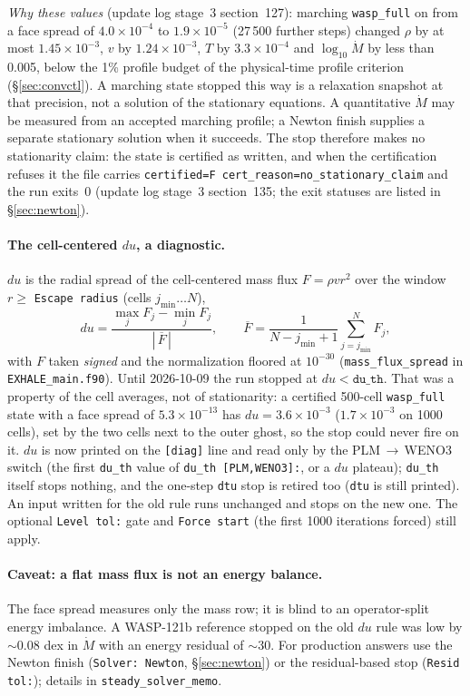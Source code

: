\documentclass[english,a4paper]{my_memo}
\begin{document}
\emph{Why these values} (update log stage~3 section~127): marching
\texttt{wasp\_full} on from a face spread of $4.0\times10^{-4}$ to
$1.9\times10^{-5}$ (27\,500 further steps) changed $\rho$ by at most
$1.45\times10^{-3}$, $v$ by $1.24\times10^{-3}$, $T$ by $3.3\times10^{-4}$ and
$\log_{10}\dot M$ by less than 0.005, below the 1\% profile budget of the
physical-time profile criterion (\S\ref{sec:convctl}). A marching state
stopped this way is a relaxation snapshot at that precision, not a solution of
the stationary equations. A quantitative $\dot M$ may be measured from an
accepted marching profile; a Newton finish supplies a separate stationary
solution when it succeeds.
The stop therefore makes no stationarity claim: the state is certified as
written, and when the certification refuses it the file carries
\texttt{certified=F cert\_reason=no\_stationary\_claim} and the run exits~0
(update log stage~3 section~135; the exit statuses are listed in
\S\ref{sec:newton}).

\paragraph{The cell-centered $du$, a diagnostic.}
$du$ is the radial spread of the cell-centered mass flux $F=\rho v r^2$ over the
window $r\ge$ \texttt{Escape radius} (cells $j_{\min}\ldots N$),
\[
  du = \frac{\max_j F_j - \min_j F_j}{|\,\overline{F}\,|},
  \qquad \overline{F}=\frac{1}{N-j_{\min}+1}\sum_{j=j_{\min}}^{N} F_j ,
\]
with $F$ taken \emph{signed} and the normalization floored at $10^{-30}$
(\texttt{mass\_flux\_spread} in \texttt{EXHALE\_main.f90}). Until 2026-10-09 the
run stopped at $du<\texttt{du\_th}$. That was a property of the cell averages,
not of stationarity: a certified 500-cell \texttt{wasp\_full} state with a face
spread of $5.3\times10^{-13}$ has $du=3.6\times10^{-3}$ ($1.7\times10^{-3}$ on
1000 cells), set by the two cells next to the outer ghost, so the stop could
never fire on it. $du$ is now printed on the \texttt{[diag]} line and read only
by the PLM\,$\to$\,WENO3 switch (the first \texttt{du\_th} value of
\texttt{du\_th [PLM,WENO3]:}, or a $du$ plateau); \texttt{du\_th} itself stops
nothing, and the one-step \texttt{dtu} stop is retired too (\texttt{dtu} is
still printed). An input written for the old rule runs unchanged and stops on
the new one. The optional \texttt{Level tol:} gate and \texttt{Force start}
(the first 1000 iterations forced) still apply.

\paragraph{Caveat: a flat mass flux is not an energy balance.} The face spread
measures only the mass row; it is blind to an operator-split energy
imbalance. A WASP-121b reference stopped on the old $du$ rule was low by
$\sim$0.08 dex in $\dot M$ with an energy residual of $\sim$30. For production
answers use the Newton finish (\texttt{Solver: Newton}, \S\ref{sec:newton}) or
the residual-based stop (\texttt{Resid tol:}); details in
\texttt{steady\_solver\_memo}.
\end{document}
